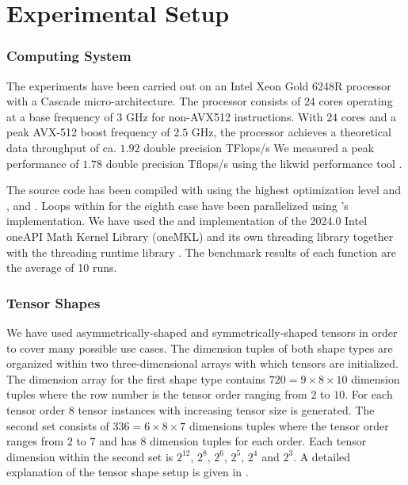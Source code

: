 \section{Experimental Setup}
\label{sec:experimental.setup}
\subsubsection{Computing System} 
The experiments have been carried out on an Intel Xeon Gold 6248R processor with a Cascade micro-architecture. The processor consists of $24$ cores operating at a base frequency of $3$ GHz for non-AVX512 instructions.
With $24$ cores and a peak AVX-512 boost frequency of $2.5$ GHz, the processor achieves a theoretical data throughput of ca. $1.92$ double precision TFlops/s
We measured a peak performance of $1.78$ double precision Tflops/s using the likwid performance tool \tq.

The source code has been compiled with   using the highest optimization level  and ,  and . 
Loops within for the eighth case have been parallelized using 's   implementation.
We have used the  and  implementation of the 2024.0 Intel oneAPI Math Kernel Library (oneMKL) and its own threading library  together with the threading runtime library .
The benchmark results of each function are the average of 10 runs.

\subsubsection{Tensor Shapes} 
We have used asymmetrically-shaped and symmetrically-shaped tensors in order to cover many possible use cases. 
The dimension tuples of both shape types are organized within two three-dimensional arrays with which tensors are initialized.
The dimension array for the first shape type contains $720 = 9\times 8 \times 10$ dimension tuples where the row number is the tensor order ranging from $2$ to $10$. 
For each tensor order $8$ tensor instances with increasing tensor size is generated.
The second set consists of $336 = 6\times8\times 7$ dimensions tuples where the tensor order ranges from $2$ to $7$ and has $8$ dimension tuples for each order.
Each tensor dimension within the second set is $2^{12}$, $2^{8}$, $2^{6}$, $2^5$, $2^4$ and $2^3$.
A detailed explanation of the tensor shape setup is given in \cite{bassoy:2019:ttv, bassoy:2018:fast}.

